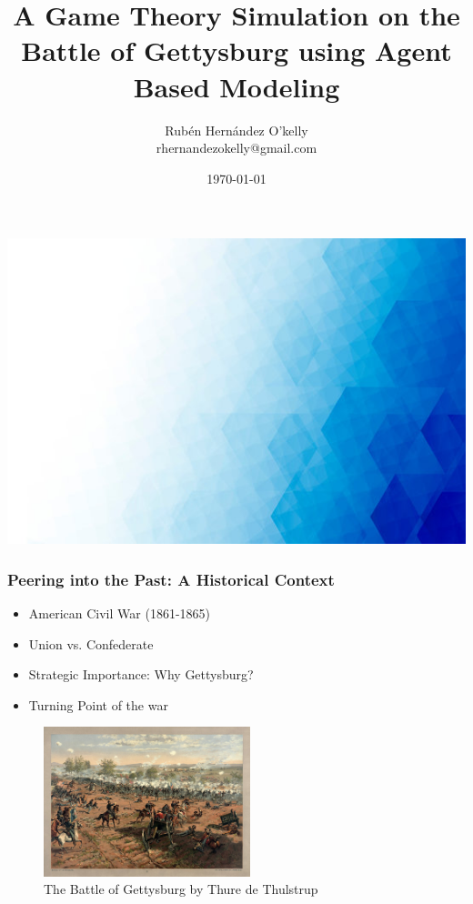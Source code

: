 \documentclass{beamer}
\title{A Game Theory Simulation on the Battle of Gettysburg using Agent Based Modeling}
\author{Rubén Hernández O'kelly\\{\small rhernandezokelly@gmail.com}}
\institute{Institute for Computing in Research}
\date{\today}
\begin{document}
{                  
  \includegraphics[width=\paperwidth, height=\paperheight]{backgroundimage2.jpg}
}

\begin{frame}
  \titlepage
\end{frame}

\begin{frame}
  \frametitle{Peering into the Past: A Historical Context}
  \begin{itemize}
    \item American Civil War (1861-1865)
    \item Union vs. Confederate
    \item Strategic Importance: Why Gettysburg?
    \item Turning Point of the war
  \end{itemize}
  \begin{figure}
  \centering
      \includegraphics[width=6cm]{Battle_gettysburg_Image}
      \caption{The Battle of Gettysburg by Thure de Thulstrup}
      \label{fig:Battle}
  \centering
  \end{figure}    
\end{frame}
\end{document}
